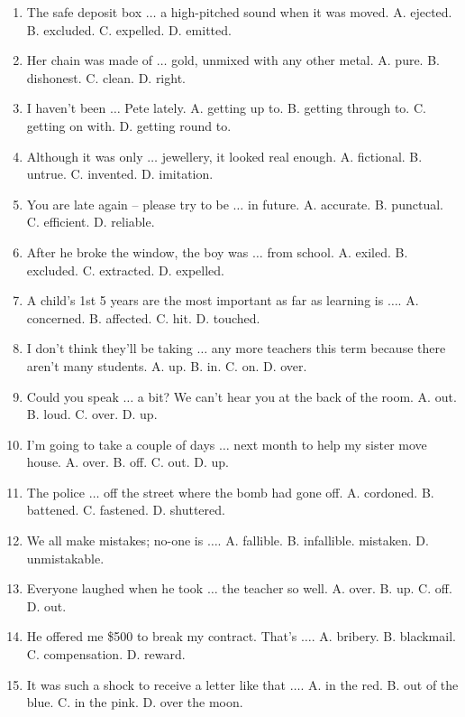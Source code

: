 \documentclass{article}
\numberwithin{equation}{section}
\begin{document}
\begin{enumerate}[leftmargin=8mm]
	\item The safe deposit box $\ldots$ a high-pitched sound when it was moved. {\sf A.} ejected. {\sf B.} excluded. {\sf C.} expelled. {\sf D.} emitted.
	\item Her chain was made of $\ldots$ gold, unmixed with any other metal. {\sf A.} pure. {\sf B.} dishonest. {\sf C.} clean. {\sf D.} right.
	\item I haven't been $\ldots$ Pete lately. {\sf A.} getting up  to. {\sf B.} getting through to. {\sf C.} getting on with. {\sf D.} getting round to.
	\item Although it was only $\ldots$ jewellery, it looked real enough. {\sf A.} fictional. {\sf B.} untrue. {\sf C.} invented. {\sf D.} imitation.
	\item You are late again -- please try to be $\ldots$ in future. {\sf A.} accurate. {\sf B.} punctual. {\sf C.} efficient. {\sf D.} reliable.
	\item After he broke the window, the boy was $\ldots$ from school. {\sf A.} exiled. {\sf B.} excluded. {\sf C.} extracted. {\sf D.} expelled.
	\item A child's 1st 5 years are the most important as far as learning is $\ldots$. {\sf A.} concerned. {\sf B.} affected. {\sf C.} hit. {\sf D.} touched.
	\item I don't think they'll be taking $\ldots$ any more teachers this term because there aren't many students. {\sf A.} up. {\sf B.} in. {\sf C.} on. {\sf D.} over.
	\item Could you speak $\ldots$ a bit? We can't hear you at the back of the room. {\sf A.} out. {\sf B.} loud. {\sf C.} over. {\sf D.} up.
	\item I'm going to take a couple of days $\ldots$ next month to help my sister move house. {\sf A.} over. {\sf B.} off. {\sf C.} out. {\sf D.} up.
	\item The police $\ldots$ off the street where the bomb had gone off. {\sf A.} cordoned. {\sf B.} battened. {\sf C.} fastened. {\sf D.} shuttered.
	\item We all make mistakes; no-one is $\ldots$. {\sf A.} fallible. {\sf B.} infallible. mistaken. {\sf D.} unmistakable.
	\item Everyone laughed when he took $\ldots$ the teacher so well. {\sf A.} over. {\sf B.} up. {\sf C.} off. {\sf D.} out.
	\item He offered me \$500 to break my contract. That's $\ldots$. {\sf A.} bribery. {\sf B.} blackmail. {\sf C.} compensation. {\sf D.} reward.
	\item It was such a shock to receive a letter like that $\ldots$. {\sf A.} in the red. {\sf B.} out of the blue. {\sf C.} in the pink. {\sf D.} over the moon.

\end{enumerate}
\end{document}
